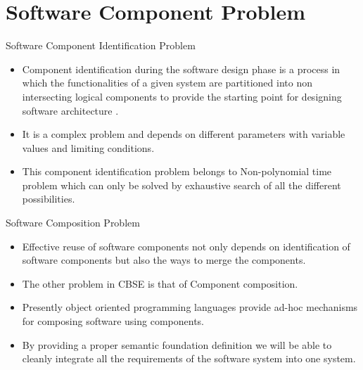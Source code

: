 \documentclass{beamer}
\begin{document}
\section{Software Component Problem}
\begin{frame}{Software Component Identification Problem}
	\begin{itemize}
		\item Component identification during the software design phase is a process in which the functionalities of a given system are partitioned into non intersecting logical components to provide the starting point for designing software architecture \cite{survey}\cite{componentDef}.
		\item It is a complex problem and depends on
		different parameters with variable values and limiting conditions.
		\item This component identification problem belongs to Non-polynomial time problem which can only be solved by
		exhaustive search of all the different possibilities\cite{2}.
	\end{itemize}
\end{frame}
\begin{frame}{Software Composition Problem}
	\begin{itemize}
		\item Effective reuse of software components not only depends on identification of software components but also the ways to merge the components.
		\item The other problem in CBSE is that
		of Component composition.
		\item Presently object oriented programming languages provide ad-hoc mechanisms for composing software using components.
		\item By providing a proper semantic
		foundation definition we will be able to cleanly integrate all the requirements of the software
		system into one system\cite{softwareComposition}\cite{dynamicComp}.
	\end{itemize}
\end{frame}
\end{document}
